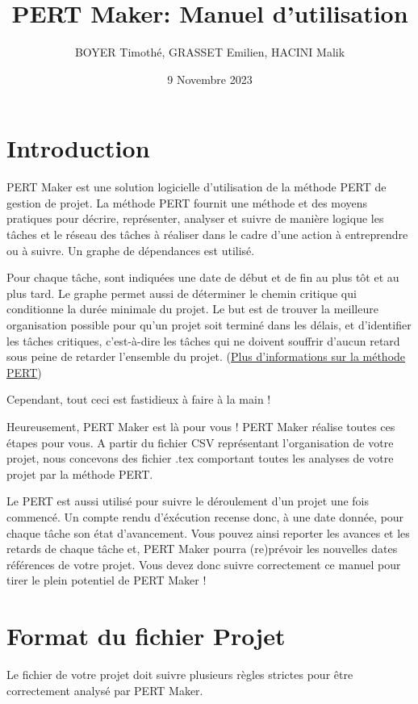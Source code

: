\documentclass{article}
\title{\centering PERT Maker: Manuel d'utilisation}
\author{BOYER Timothé, GRASSET Emilien, HACINI Malik}
\date{9 Novembre 2023}
\begin{document}
    
    

\maketitle
\tableofcontents{}

\section{Introduction}
PERT Maker est une solution logicielle d'utilisation de la méthode PERT de gestion de projet.
La méthode PERT fournit une méthode et des moyens pratiques pour décrire,
représenter, analyser et suivre de manière logique les tâches et le réseau des tâches à réaliser dans le cadre d'une 
action à entreprendre ou à suivre.
Un graphe de dépendances est utilisé. 

Pour chaque tâche, sont indiquées une date de début et de fin au plus tôt et au plus tard. 
Le graphe permet aussi de déterminer le chemin critique qui conditionne la durée minimale du projet.
Le but est de trouver la meilleure organisation possible pour qu'un projet soit terminé dans les délais, et d'identifier les tâches critiques, 
c'est-à-dire les tâches qui ne doivent souffrir d'aucun retard sous peine de retarder l'ensemble du projet.
(\href{https://fr.wikipedia.org/wiki/PERT}{Plus d'informations sur la méthode PERT})

Cependant, tout ceci est fastidieux à faire à la main ! 

Heureusement, PERT Maker est là pour vous !
PERT Maker réalise toutes ces étapes pour vous. 
A partir du fichier CSV représentant l'organisation de votre projet,
nous concevons des fichier .tex comportant toutes les analyses de votre projet par la méthode PERT.

Le PERT est aussi utilisé pour suivre le déroulement d’un projet une fois commencé. Un compte
rendu d'éxécution recense donc, à une date donnée, pour chaque tâche son état d’avancement. Vous pouvez ainsi
reporter les avances et les retards de chaque tâche et, PERT Maker pourra (re)prévoir les nouvelles dates références de votre projet.
Vous devez donc suivre correctement ce manuel pour tirer le plein potentiel de PERT Maker !

\section{Format du fichier Projet}
Le fichier de votre projet doit suivre plusieurs règles strictes pour être correctement analysé par PERT Maker.
\end{document}
